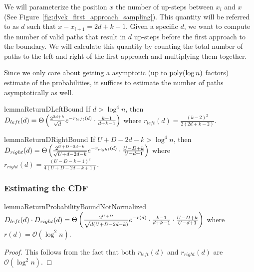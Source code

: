 We will parameterize the position $x$ the number of up-steps between $x_i$ and $x$
(See Figure~\ref{fig:dyck_first_approach_sampling}).
This quantity will be referred to as $d$ such that $x - x_{i+1} = 2d + k-1$.
Given a specific $d$, we want to compute the number of valid paths that result in
$d$ up-steps before the first approach to the boundary.
We will calculate this quantity by counting the total number of paths to the left and right
of the first approach and multiplying them together.

Since we only care about getting a asymptotic (up to $\mathrm{poly}(\log n)$ factors) estimate of the probabilities,
it suffices to estimate the number of paths asymptotically as well.

\begin{restatable}{lemma}{ReturnDLeftBound}
\label{lem:ReturnDLeftBound}
If $d > \log^4 n$, then $D_{left}(d)
= \Theta\left( \frac{2^{2d+k}}{\sqrt{d}}\mathlarger e^{-r_{left}(d)}\cdot \frac{k-1}{d+k-1}\right)$
where $r_{left}(d) = \frac{(k-2)^2}{2(2d+k-2)}$.
\end{restatable}

\begin{restatable}{lemma}{ReturnDRightBound}
\label{lem:ReturnDRightBound}
If $U+D-2d-k > \log^4 n$, then $D_{right}(d)
= \Theta\left( \frac{2^{U+D-2d-k}}{\sqrt{U+d-2d-k}}\mathlarger e^{-r_{right}(d)}\cdot \frac{U-D+k}{U-d+1}\right)$
where $r_{right}(d) = \frac{(U-D-k-1)^2}{4(U+D-2d-k+1)}$.
\end{restatable}


\subsubsection{Estimating the CDF}%
\label{sec:estimating_the_cdf}

\begin{restatable}{lemma}{ReturnProbabilityBoundNotNormalized}
\label{lem:ReturnProbabilityBoundNotNormalized}
$D_{left}(d)\cdot D_{right}(d)
= \Theta\left( \frac{2^{U+D}}{\sqrt{d(U+D-2d-k)}}\mathlarger e^{-r(d)}\cdot\frac{k-1}{d+k-1}\cdot\frac{U-D+k}{U-d+1}\right)$
where $r(d)=\mathcal O(\log^2 n)$.
\end{restatable}
\begin{proof}
This follows from the fact that both $r_{left}(d)$ and $r_{right}(d)$ are $\mathcal O(\log^2 n)$.
\end{proof}

